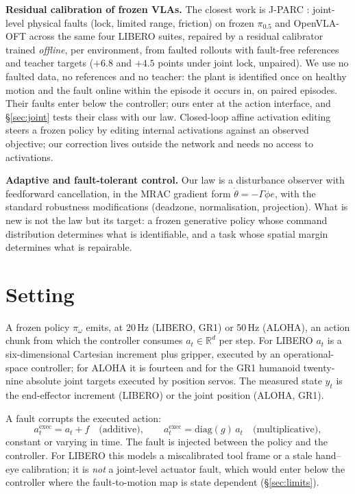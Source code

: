 \documentclass{article}
\begin{document}
\textbf{Residual calibration of frozen VLAs.} The closest work is J-PARC
\citep{jparc2026}: joint-level physical faults (lock, limited range, friction) on frozen
$\pi_{0.5}$ and OpenVLA-OFT across the same four LIBERO suites, repaired by a residual
calibrator trained \emph{offline}, per environment, from faulted rollouts with fault-free
references and teacher targets ($+6.8$ and $+4.5$ points under joint lock, unpaired). We use
no faulted data, no references and no teacher: the plant is identified once on healthy
motion and the fault online within the episode it occurs in, on paired episodes. Their
faults enter below the controller; ours enter at the action interface, and
\S\ref{sec:joint} tests their class with our law. Closed-loop affine activation editing
\citep{clae2026} steers a frozen policy by editing internal activations against an observed
objective; our correction lives outside the network and needs no access to activations.

\textbf{Adaptive and fault-tolerant control.} Our law is a disturbance observer with
feedforward cancellation, in the MRAC gradient form $\dot\theta = -\Gamma\phi e$, with the
standard robustness modifications (deadzone, normalisation, projection). What is new is
not the law but its target: a frozen generative policy whose command distribution
determines what is identifiable, and a task whose spatial margin determines what is
repairable.

\section{Setting}
\label{sec:setting}

A frozen policy $\pi_\omega$ emits, at 20\,Hz (LIBERO, GR1) or 50\,Hz (ALOHA), an action
chunk from which the controller consumes $a_t\in\mathbb{R}^d$ per step. For LIBERO $a_t$ is
a six-dimensional Cartesian increment plus gripper, executed by an operational-space
controller; for ALOHA it is fourteen and for the GR1 humanoid twenty-nine absolute joint
targets executed by position servos. The measured state $y_t$ is the end-effector
increment (LIBERO) or the joint position (ALOHA, GR1).

A fault corrupts the executed action:
\[
a^{\mathrm{exec}}_t = a_t + f \quad\text{(additive)},\qquad
a^{\mathrm{exec}}_t = \mathrm{diag}(g)\,a_t \quad\text{(multiplicative)},
\]
constant or varying in time. The fault is injected between the policy and the controller.
For LIBERO this models a miscalibrated tool frame or a stale hand--eye calibration; it is
\emph{not} a joint-level actuator fault, which would enter below the controller where the
fault-to-motion map is state dependent (\S\ref{sec:limits}).
\end{document}
